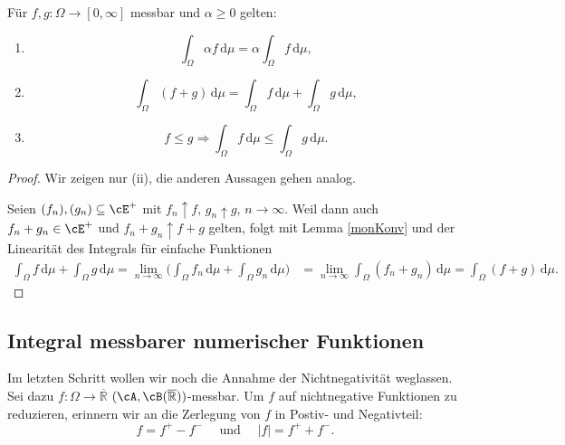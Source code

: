 \begin{lemma}\label{RRnichtneg}
	Für $f,g \! : \Omega \rightarrow [0, \infty]$ messbar und $ \alpha \geq 0$ gelten:
	\begin{enumerate}[label=(\roman*)]
		\item \[ \int_{\Omega} \alpha f \,\mathrm{d}\mu = \alpha \int_{\Omega} f \,\mathrm{d}\mu, \]
		\item \[ \int_{\Omega} (f + g)\, \mathrm{d}\mu = \int_{\Omega} f \,\mathrm{d}\mu + \int_{\Omega} g \,\mathrm{d}\mu, \]
		\item \[ f \leq g \Rightarrow \int_{\Omega} f\, \mathrm{d}\mu \leq \int_{\Omega} g\, \mathrm{d}\mu. \]
	\end{enumerate}
\end{lemma}

\begin{proof}
	Wir zeigen nur (ii), die anderen Aussagen gehen analog.\smallskip
	
		Seien $(f_n), (g_n) \subseteq \cE^+$ mit $f_n \uparrow f$, $g_n \uparrow g$, $n \to \infty$. Weil dann auch $f_n+g_n \in \cE^+$ und $f_n+g_n\uparrow f+g$ gelten, folgt mit Lemma \ref{monKonv} und der Linearit\"at des Integrals f\"ur einfache Funktionen
		\begin{align*}
			 \int_{\Omega} f \,\mathrm{d}\mu + \int_{\Omega} g\, \mathrm{d}\mu=\lim_{n\to\infty}\Bigg(\int_{\Omega} f_n\, \mathrm{d}\mu + \int_{\Omega} g_n \,\mathrm{d}\mu\Bigg)  &=\lim_{n\to\infty} \int_{\Omega} (f_n + g_n)\, \mathrm{d}\mu=\int_{\Omega} (f + g)\, \mathrm{d}\mu.
		\end{align*}
\end{proof}

\subsection{Integral messbarer numerischer Funktionen}
Im letzten Schritt wollen wir noch die Annahme der Nichtnegativit\"at weglassen. Sei dazu $f \! : \Omega \rightarrow \overline{\mathbb{R}}$ $(\cA, \cB(\mathbb{\overline R}))$-messbar. Um $f$ auf nichtnegative Funktionen zu reduzieren, erinnern wir an die Zerlegung von $f$ in Postiv- und Negativteil: $$f = f^+ - f^-\quad \text{ und }\quad |f| = f^+ + f^-.$$

